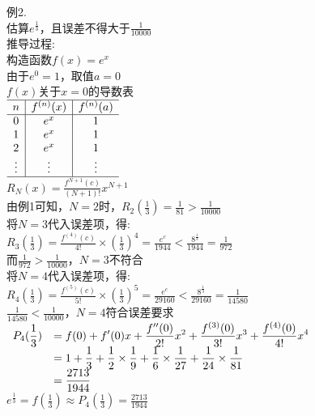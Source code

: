 例2.\\
估算$e^{\frac{1}{3}}$，且误差不得大于$\displaystyle\frac{1}{10000}$\\
推导过程:\\
构造函数$f(x)=e^x$\\
由于$e^0=1$，取值$a=0$\\
$f(x)$关于$x=0$的导数表\\[1ex]
$\begin{array}{c|c|c}
\hline
n & f^{(n)}(x) & f^{(n)}(a)\\
\hline
0 & e^x & 1\\
1 & e^x & 1\\
2 & e^x & 1\\
\vdots & \vdots & \vdots\\
\hline
\end{array}$\\[1ex]
$\displaystyle R_N(x)=\frac{f^{N+1}(c)}{(N+1)!}x^{N+1}$\\
由例1可知，$N=2$时，$\displaystyle R_2(\frac{1}{3})=\frac{1}{81}>\frac{1}{10000}$\\
将$N=3$代入误差项，得:\\
$\displaystyle R_3(\frac{1}{3})=\frac{f^{(4)}(c)}{4!}\times(\frac{1}{3})^4=\frac{e^c}{1944}<\frac{8^{\frac{1}{3}}}{1944}=\frac{1}{972}$\\
而$\displaystyle\frac{1}{972}>\frac{1}{10000}$，$N=3$不符合\\
将$N=4$代入误差项，得:\\
$\displaystyle R_4(\frac{1}{3})=\frac{f^{(5)}(c)}{5!}\times(\frac{1}{3})^5=\frac{e^c}{29160}<\frac{8^{\frac{1}{3}}}{29160}=\frac{1}{14580}$\\
$\displaystyle\frac{1}{14580}<\frac{1}{10000}$，$N=4$符合误差要求\\
$\begin{array}{>{\displaystyle}r >{\displaystyle}l}
P_4(\frac{1}{3}) & =f(0)+f'(0)x+\frac{f''(0)}{2!}x^2+\frac{f^{(3)}(0)}{3!}x^3+\frac{f^{(4)}(0)}{4!}x^4\\
& =1+\frac{1}{3}+\frac{1}{2}\times\frac{1}{9}+\frac{1}{6}\times\frac{1}{27}+\frac{1}{24}\times\frac{1}{81}\\
& =\frac{2713}{1944}
\end{array}$\\
$\displaystyle e^{\frac{1}{3}}=f(\frac{1}{3})\approx P_4(\frac{1}{3})=\frac{2713}{1944}$\\[2ex]

